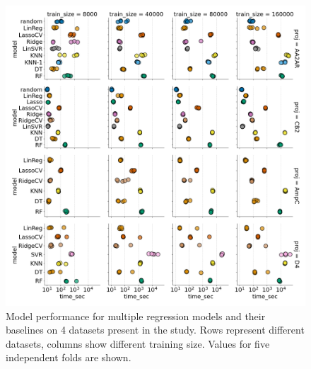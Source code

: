 \begin{figure}[ht]
\centering
\includegraphics[width=1.0\textwidth]{figures/figure_3_single-shot-performance.png}
\caption{Model performance for multiple regression models and their baselines on 4 datasets present in the study. Rows represent different datasets, columns show different training size. Values for five independent folds are shown.}
\label{fig:fig_3_singleshot}
\end{figure}


